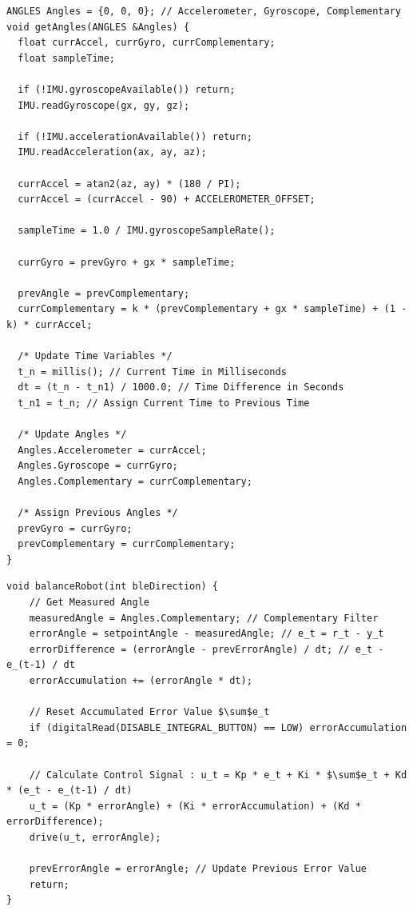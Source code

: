 \documentclass{article}
\begin{document}
\begin{lstlisting}[caption={Arduino IMU Complementary Filter Firmware Implementation}, label={lst:arduino_angle_code}]
ANGLES Angles = {0, 0, 0}; // Accelerometer, Gyroscope, Complementary
void getAngles(ANGLES &Angles) {
  float currAccel, currGyro, currComplementary;
  float sampleTime;

  if (!IMU.gyroscopeAvailable()) return;
  IMU.readGyroscope(gx, gy, gz);

  if (!IMU.accelerationAvailable()) return;
  IMU.readAcceleration(ax, ay, az);

  currAccel = atan2(az, ay) * (180 / PI);
  currAccel = (currAccel - 90) + ACCELEROMETER_OFFSET;

  sampleTime = 1.0 / IMU.gyroscopeSampleRate();

  currGyro = prevGyro + gx * sampleTime;

  prevAngle = prevComplementary;
  currComplementary = k * (prevComplementary + gx * sampleTime) + (1 - k) * currAccel;

  /* Update Time Variables */
  t_n = millis(); // Current Time in Milliseconds
  dt = (t_n - t_n1) / 1000.0; // Time Difference in Seconds
  t_n1 = t_n; // Assign Current Time to Previous Time

  /* Update Angles */
  Angles.Accelerometer = currAccel;
  Angles.Gyroscope = currGyro;
  Angles.Complementary = currComplementary;

  /* Assign Previous Angles */
  prevGyro = currGyro;
  prevComplementary = currComplementary;
}
\end{lstlisting}

\begin{lstlisting}[caption={Arduino PID Firmware Implementation}, label={lst:arduino_pid_code}]
void balanceRobot(int bleDirection) {
    // Get Measured Angle
    measuredAngle = Angles.Complementary; // Complementary Filter
    errorAngle = setpointAngle - measuredAngle; // e_t = r_t - y_t
    errorDifference = (errorAngle - prevErrorAngle) / dt; // e_t - e_(t-1) / dt
    errorAccumulation += (errorAngle * dt);

    // Reset Accumulated Error Value $\sum$e_t
    if (digitalRead(DISABLE_INTEGRAL_BUTTON) == LOW) errorAccumulation = 0;

    // Calculate Control Signal : u_t = Kp * e_t + Ki * $\sum$e_t + Kd * (e_t - e_(t-1) / dt)
    u_t = (Kp * errorAngle) + (Ki * errorAccumulation) + (Kd * errorDifference);
    drive(u_t, errorAngle);

    prevErrorAngle = errorAngle; // Update Previous Error Value
    return;
}
\end{lstlisting}
\end{document}
